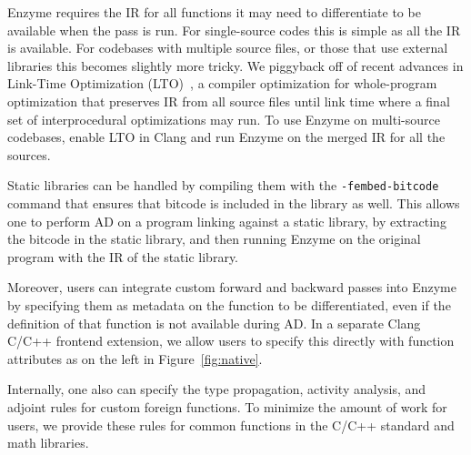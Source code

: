 Enzyme requires the IR for all functions it may need to differentiate to be available when the pass is run. For single-source codes this is simple as all the IR is available. For codebases with multiple source files, or those that use external libraries this becomes slightly more tricky. We piggyback off of recent advances in Link-Time Optimization (LTO)~\cite{Johnson2017-lm}, a compiler optimization for whole-program optimization that preserves IR from all source files until link time where a final set of interprocedural optimizations may run. To use Enzyme on multi-source codebases, enable LTO in Clang and run Enzyme on the merged IR for all the sources.

Static libraries can be handled by compiling them with the \texttt{-fembed-bitcode} command that ensures that bitcode is included in the library as well. This allows one to perform AD on a program linking against a static library, by extracting the bitcode in the static library, and then running Enzyme on the original program with the IR of the static library.

Moreover, users can integrate custom forward and backward passes into Enzyme by specifying them as metadata on the function to be differentiated, even if the definition of that function is not available during AD. In a separate Clang C/C++ frontend extension, we allow users to specify this directly with function attributes as on the left in Figure~\ref{fig:native}.

Internally, one also can specify the type propagation, activity analysis, and adjoint rules for custom foreign functions. To minimize the amount of work for users, we provide these rules for common functions in the C/C++ standard and math libraries.


